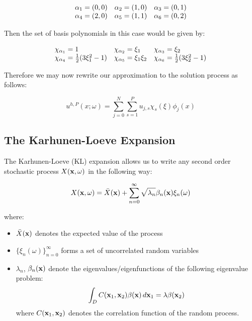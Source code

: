 \begin{equation}
  \begin{array}{c c c }
    \alpha_1 = (0,0) & \alpha_2 = (1,0) & \alpha_3 = (0,1) \\
    \alpha_4 = (2,0) & \alpha_5 = (1,1) & \alpha_6 = (0,2)
  \end{array}
\end{equation}

Then the set of basis polynomials in this case would be given by:

\begin{equation}
  \begin{array}{l l l}
    \chi_{\alpha_1} = 1 & \chi_{\alpha_2} = \xi_1 & \chi_{\alpha_3} = \xi_2 \\
    \chi_{\alpha_4} = \frac{1}{2}(3\xi_1^2 - 1) &
    \chi_{\alpha_5} = \xi_1\xi_2 &
    \chi_{\alpha_6} = \frac{1}{2}(3\xi_2^2 - 1)
  \end{array}
\end{equation}

Therefore we may now rewrite our approximation to the solution process
 as follows:

\begin{equation}\label{eq:oned-stochastic-uhp}
    u^{h,P}(x;\omega) = \sum_{j=0}^N\sum_{s=1}^Pu_{j,s}\chi_s(\xi)\phi_j(x)
\end{equation}

\subsection{The Karhunen-Loeve Expansion}

The Karhunen-Loeve (KL) expansion allows us to write any second order
stochastic process $X(\mathbf{x},\omega)$ in the following way:

\begin{equation}
    X(\mathbf{x}, \omega) = \bar{X}(\mathbf{x})
    + \sum_{n = 0}^\infty\sqrt{\lambda_n}\beta_n(\mathbf{x})\xi_n(\omega)
\end{equation}

where:

\begin{itemize}
    \item $\bar{X}(\mathbf{x})$ denotes the expected value of the process
    \item $\{\xi_n(\omega)\}_{n=0}^\infty$ forms a set of uncorrelated random
          variables
    \item $\lambda_n$, $\beta_n(\mathbf{x})$ denote the eigenvalues/eigenfunctions
          of the following eigenvalue problem:
          \[
                \int_DC(\mathbf{x}_1, \mathbf{x}_2)\beta(\mathbf{x})\, d\mathbf{x}_1
                = \lambda\beta(\mathbf{x}_2)
          \]
          where $C(\mathbf{x}_1,\mathbf{x}_2)$ denotes the correlation function of the
          random process.
\end{itemize}


